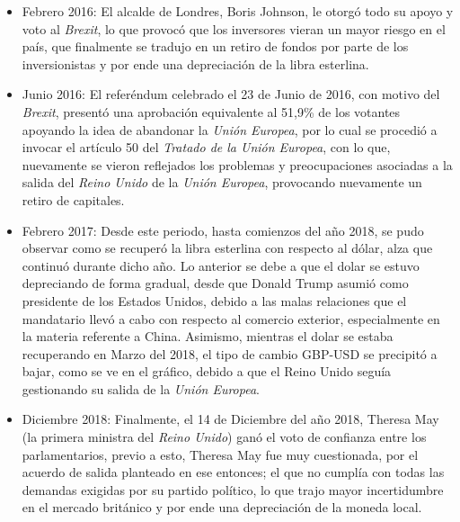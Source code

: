 \begin{itemize}
    \item Febrero 2016: El alcalde de Londres, Boris Johnson, le otorgó todo su apoyo y voto al \textit{Brexit}, lo que provocó que los inversores vieran un mayor riesgo en el país, que finalmente se tradujo en un retiro de fondos por parte de los inversionistas y por ende una depreciación de la libra esterlina.
    
    \item Junio 2016: El referéndum celebrado el 23 de Junio de 2016, con motivo del \textit{Brexit}, presentó una aprobación equivalente al 51,9\% de los votantes apoyando la idea de abandonar la \textit{Unión Europea}, por lo cual se procedió a invocar el artículo 50 del \textit{Tratado de la Unión Europea}, con lo que, nuevamente se vieron reflejados los problemas y preocupaciones asociadas a la salida del \textit{Reino Unido} de la \textit{Unión Europea}, provocando nuevamente un retiro de capitales.
    
    \item Febrero 2017: Desde este periodo, hasta comienzos del año 2018, se pudo observar como se recuperó la libra esterlina con respecto al dólar, alza que continuó durante dicho año. Lo anterior se debe a que el dolar se estuvo depreciando de forma gradual, desde que Donald Trump asumió como presidente de los Estados Unidos, debido a las malas relaciones que el mandatario llevó a cabo con respecto al comercio  exterior, especialmente en la materia referente a China. Asimismo, mientras el dolar se estaba recuperando en Marzo del 2018, el tipo de cambio GBP-USD se precipitó a bajar, como se ve en el gráfico, debido a que el Reino Unido seguía gestionando su salida de la \textit{Unión Europea}.
    
    \item Diciembre 2018: Finalmente, el 14 de Diciembre del año 2018, Theresa May (la primera ministra del \textit{Reino Unido}) ganó el voto de confianza entre los parlamentarios, previo a esto, Theresa May fue muy cuestionada, por el acuerdo de salida planteado en ese entonces; el que no cumplía con todas las demandas exigidas por su partido político, lo que trajo mayor incertidumbre en el mercado británico y por ende una depreciación de la moneda local.

\end{itemize}
\newpage